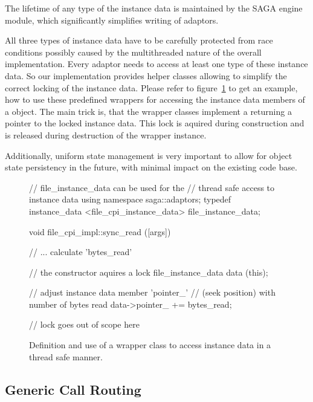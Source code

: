 The lifetime of any type of the instance data is maintained by the SAGA engine 
module, which significantly simplifies writing of adaptors.

All three types of instance data have to be carefully protected from race 
conditions possibly caused by the multithreaded nature of the overall implementation.
Every adaptor needs to access at least one type of these instance data. 
So our implementation provides helper classes allowing to simplify the 
correct locking of the instance data. Please refer to figure~\ref{src:instancedata} 
to get an example, how to use these predefined wrappers for accessing the instance 
data members of a  object. The main trick is,
that the wrapper classes implement a  returning a pointer
to the locked instance data. This lock is aquired during construction
and is released during destruction of the wrapper instance.

Additionally, uniform state management is very important to allow for
object state persistency in the future, with minimal impact on the existing
code base.

\begin{figure}[!ht]
 \begin{center}
  \begin{mycode}[label=Instance data type declaration]
    // file_instance_data can be used for the
    // thread safe access to instance data
    using namespace saga::adaptors;
    typedef instance_data <file_cpi_instance_data> 
        file_instance_data;
  \end{mycode}
  \begin{mycode}[label=Instance data usage, firstnumber=last]
     void file_cpi_impl::sync_read ([args])
     {
       // ... calculate 'bytes_read'
       { 
         // the constructor aquires a lock
         file_instance_data data (this);

         // adjust instance data member 'pointer_'
         // (seek position) with number of bytes read
         data->pointer_ += bytes_read;

       } // lock goes out of scope here
     }
  \end{mycode}
  \up
  \up
  \caption{\label{src:instancedata}
    Definition and use of a wrapper class to access instance 
    data in a thread safe manner.}
 \end{center}
\end{figure}


\subsection{Generic Call Routing}
\label{ssec:routing}

